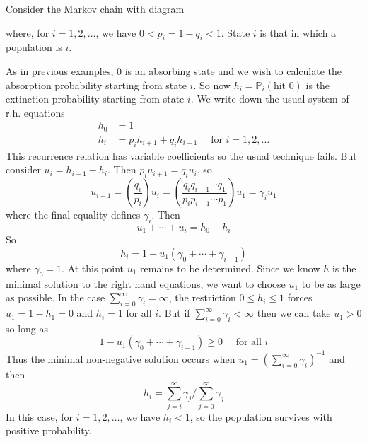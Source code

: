 \documentclass[a4paper]{article}
\begin{document}
\begin{example}
	Consider the Markov chain with diagram
    \begin{center}
        \end{center}
        where, for $i=1,2, \ldots$, we have $0<p_{i}=1-q_{i}<1$. State $i$ is that in which a population is $i$.

    As in previous examples, 0 is an absorbing state and we wish to calculate the absorption probability starting from state $i$. So now $h_{i}=\mathbb{P}_i(\text{hit 0})$ is the extinction probability starting from state $i$. We write down the usual system of r.h. equations
    \[
    \begin{aligned}
    h_{0} &=1 \\
    h_{i} &=p_{i} h_{i+1}+q_{i} h_{i-1} \quad \text { for } i=1,2, \ldots
    \end{aligned}
    \]
    This recurrence relation has variable coefficients so the usual technique fails. But consider $u_{i}=h_{i-1}-h_{i} .$ Then $p_{i} u_{i+1}=q_{i} u_{i}$, so
    \[
    u_{i+1}=\left(\frac{q_{i}}{p_{i}}\right) u_{i}=\left(\frac{q_{i} q_{i-1} \cdots q_{1}}{p_{i} p_{i-1} \cdots p_{1}}\right) u_{1}=\gamma_{i} u_{1}
    \]
    where the final equality defines $\gamma_{i} $. Then
    \[
    u_{1}+\cdots+u_{i}=h_{0}-h_{i}
    \]
    So
    \[
    h_{i}=1-u_{1}\left(\gamma_{0}+\cdots+\gamma_{i-1}\right)
    \]
    where $\gamma_{0}=1$. At this point $u_{1}$ remains to be determined. Since we know $h$ is the minimal solution to the right hand equations, we want to choose $u_{1}$ to be as large as possible. In the case $\sum_{i=0}^{\infty} \gamma_{i}=\infty$, the restriction $0 \leq h_{i} \leq 1$ forces $u_{1}=1-h_{1}=0$ and $h_{i}=1$ for all $i .$ But if $\sum_{i=0}^{\infty} \gamma_{i}<\infty$ then we can take $u_{1}>0$ so long as
    \[
    1-u_{1}\left(\gamma_{0}+\cdots+\gamma_{i-1}\right) \geq 0 \quad \text { for all } i
    \]
    Thus the minimal non-negative solution occurs when $u_{1}=\left(\sum_{i=0}^{\infty} \gamma_{i}\right)^{-1}$ and then
    \[
    h_{i}=\sum_{j=i}^{\infty} \gamma_{j}\bigg/\sum_{j=0}^{\infty} \gamma_{j}
    \]
    In this case, for $i=1,2, \ldots$, we have $h_{i}<1$, so the population survives with positive probability. 
\end{example}
\end{document}
